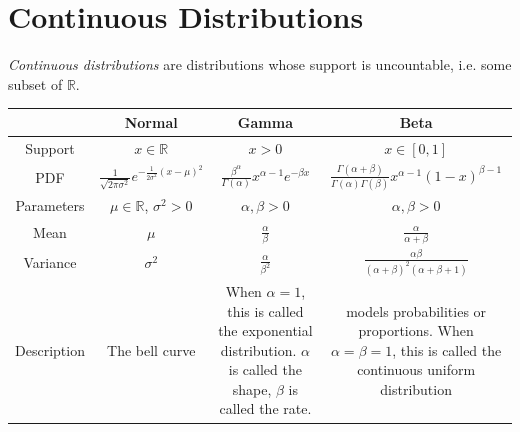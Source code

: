 \section*{Continuous Distributions}
\emph{Continuous distributions} are distributions whose support is uncountable, i.e. some subset of $\mathbb{R}$. 
\begin{table}[h]
\centering
\begin{tabular}{|c|c|c|c|}
	\hline
 & Normal& Gamma&Beta\\ \hline \hline
Support &$x \in \mathbb{R}$ & $x>0$ &$x \in [0,1]$\\  \hline
PDF & $\frac{1}{\sqrt{2\pi \sigma^2}} e^{-\frac{1}{2\sigma^2}(x-\mu)^2}$ & $\frac{\beta^\alpha}{\Gamma(\alpha)} x^{\alpha -1} e^{-\beta x}$ &$\frac{\Gamma(\alpha+\beta)}{\Gamma(\alpha)\Gamma(\beta)} x^{\alpha-1} (1-x)^{\beta-1}$\\  \hline
Parameters & $\mu \in \mathbb{R}$, $\sigma^2 > 0$ & $\alpha,\beta>0$ &$\alpha,\beta>0$\\  \hline
Mean &  $\mu$& $\frac{\alpha}{\beta}$ &$\frac{\alpha}{\alpha + \beta}$\\  \hline
Variance &$\sigma^2$& $\frac{\alpha}{\beta^2}$&$\frac{\alpha \beta}{(\alpha + \beta)^2(\alpha + \beta +1)}$\\ \hline
Description&The bell curve&\parbox{1in}{When $\alpha=1$, this is called the exponential distribution. $\alpha$ is called the shape, $\beta$ is called the rate.}&\parbox{1in}{models probabilities or proportions. When $\alpha = \beta =1$, this is called the continuous uniform distribution}\\
\hline
\end{tabular}
\end{table}

